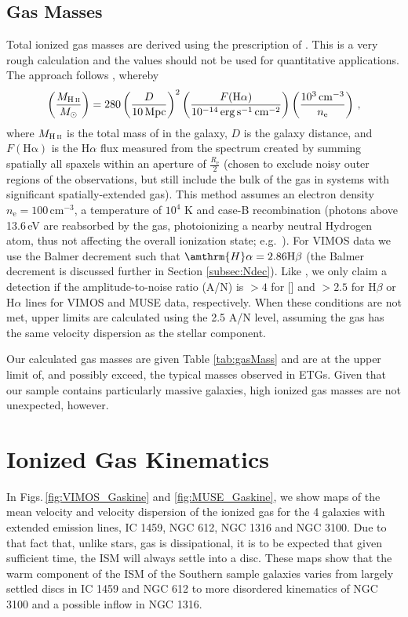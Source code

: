 	\subsection{Gas Masses}
		\label{subsec:GasMass}

		Total ionized gas masses are derived using the prescription of \citet{Sarzi2005}. This is a very rough calculation and the values should not be used for quantitative applications. The approach follows \citet{Kim1989}, whereby
		\begin{equation}
			\left(\frac{M_\text{\ion{H}{ii}}}{M_\odot}\right) = 280 \left(\frac{D}{10\, \mathrm{Mpc}}\right)^2 \left(\frac{F(\mathrm{H\alpha})}{10^{-14} \, \mathrm{erg \, s^{-1} \, cm^{-2}}}\right) \left(\frac{10^3 \, \mathrm{cm^{-3}}}{n_\mathrm{e}}\right) \, ,
		\end{equation}
		where $M_\text{\ion{H}{ii}}$ is the total mass of  in the galaxy, $D$ is the galaxy distance, and $F(\mathrm{H\alpha})$ is the H$\alpha$ flux measured from the spectrum created by summing spatially all spaxels within an aperture of $\frac{R_\mathrm{e}}{2}$ (chosen to exclude noisy outer regions of the observations, but still include the bulk of the gas in systems with significant spatially-extended gas). This method assumes an electron density $n_\mathrm{e} = 100 \, \mathrm{cm^{-3}}$, a temperature of $10^4$ K and case-B recombination (photons above 13.6\,eV are reabsorbed by the gas, photoionizing a nearby neutral Hydrogen atom, thus not affecting the overall ionization state; e.g.\ \citealt[p.\,74]{Osterbrock1974}). For VIMOS data we use the Balmer decrement such that $\amthrm{H}\alpha = 2.86 \mathrm{H}\beta$ (the Balmer decrement is discussed further in Section \ref{subsec:Ndec}). Like \citet{Sarzi2005}, we only claim a detection if the amplitude-to-noise ratio (A/N) is $>4$ for [] and $>2.5$ for H$\beta$ or H$\alpha$ lines for VIMOS and MUSE data, respectively. When these conditions are not met, upper limits are calculated using the 2.5 A/N level, assuming the gas has the same velocity dispersion as the stellar component.

		Our calculated gas masses are given Table \ref{tab:gasMass} and are at the upper limit of, and possibly exceed, the typical masses observed in ETGs. Given that our sample contains particularly massive galaxies, high ionized gas masses are not unexpected, however.

\section{Ionized Gas Kinematics}
	\label{sec:GasKin}
	In Figs.\,\ref{fig:VIMOS_Gaskine} and \ref{fig:MUSE_Gaskine}, we show maps of the mean velocity and velocity dispersion of the ionized gas for the 4 galaxies with extended emission lines, IC 1459, NGC 612, NGC 1316 and NGC 3100. Due to that fact that, unlike stars, gas is dissipational, it is to be expected that given sufficient time, the ISM will always settle into a disc. These maps show that the warm component of the ISM of the Southern sample galaxies varies from largely settled discs in IC 1459 and NGC 612 to more disordered kinematics of NGC 3100 and a possible inflow in NGC 1316.

